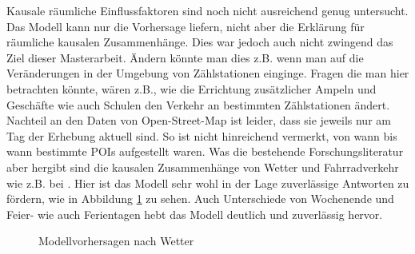 \documentclass[a4paper,12pt]{thesis}
\begin{document}
Kausale räumliche Einflussfaktoren sind noch nicht ausreichend genug untersucht. Das Modell kann nur die Vorhersage liefern, nicht aber die Erklärung für räumliche kausalen Zusammenhänge. Dies war jedoch auch nicht zwingend das Ziel dieser Masterarbeit. Ändern könnte man dies z.B. wenn man auf die Veränderungen in der Umgebung von Zählstationen einginge. Fragen die man hier betrachten könnte, wären z.B., wie die Errichtung zusätzlicher Ampeln und Geschäfte wie auch Schulen den Verkehr an bestimmten Zählstationen ändert. Nachteil an den Daten von Open-Street-Map ist leider, dass sie jeweils nur am Tag der Erhebung aktuell sind. So ist nicht hinreichend vermerkt, von wann bis wann bestimmte POIs aufgestellt waren. Was die bestehende Forschungsliteratur aber hergibt sind die kausalen Zusammenhänge von Wetter und Fahrradverkehr wie z.B. bei \cite{Wessel2020}. Hier ist das Modell sehr wohl in der Lage zuverlässige Antworten zu fördern, wie in Abbildung \ref{fig:Temperaturunterschied} zu sehen. Auch Unterschiede von Wochenende und Feier- wie auch Ferientagen hebt das Modell deutlich und zuverlässig hervor.

\begin{figure}%
	\centering
	
	\caption{Modellvorhersagen nach Wetter}%
	\label{fig:Temperaturunterschied}%
\end{figure}
\end{document}
